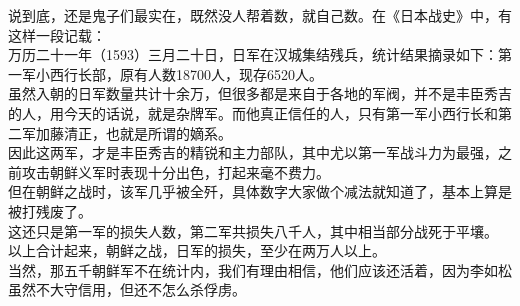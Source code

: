 \begin{multicols}{\theparacolNo}
说到底，还是鬼子们最实在，既然没人帮着数，就自己数。在《日本战史》中，有这样一段记载：\\

万历二十一年（1593）三月二十日，日军在汉城集结残兵，统计结果摘录如下：第一军小西行长部，原有人数18700人，现存6520人。\\

虽然入朝的日军数量共计十余万，但很多都是来自于各地的军阀，并不是丰臣秀吉的人，用今天的话说，就是杂牌军。而他真正信任的人，只有第一军小西行长和第二军加藤清正，也就是所谓的嫡系。\\

因此这两军，才是丰臣秀吉的精锐和主力部队，其中尤以第一军战斗力为最强，之前攻击朝鲜义军时表现十分出色，打起来毫不费力。\\

但在朝鲜之战时，该军几乎被全歼，具体数字大家做个减法就知道了，基本上算是被打残废了。\\

这还只是第一军的损失人数，第二军共损失八千人，其中相当部分战死于平壤。\\

以上合计起来，朝鲜之战，日军的损失，至少在两万人以上。\\

当然，那五千朝鲜军不在统计内，我们有理由相信，他们应该还活着，因为李如松虽然不大守信用，但还不怎么杀俘虏。\\

\ifnum{}
	\end{multicols}
\fi
\newpage

